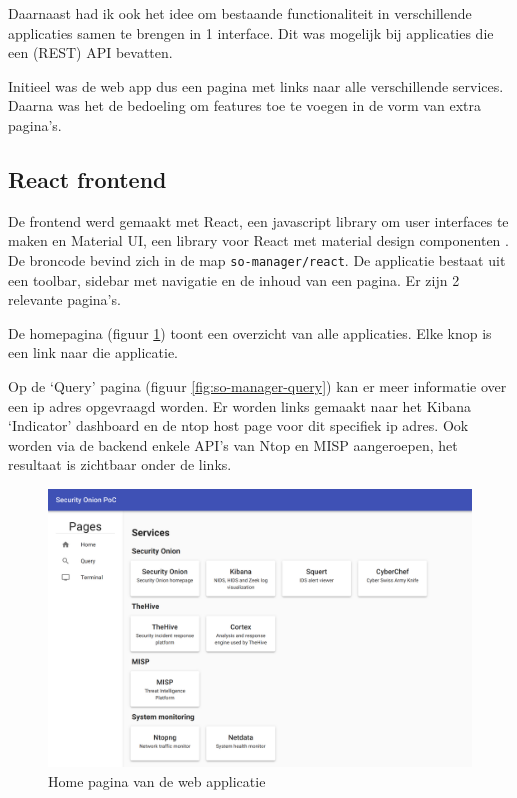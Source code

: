 \documentclass[a4paper,12pt]{report}
\begin{document}
Daarnaast had ik ook het idee om bestaande functionaliteit in verschillende applicaties samen te brengen in 1 interface.
Dit was mogelijk bij applicaties die een (REST) API bevatten.

Initieel was de web app dus een pagina met links naar alle verschillende services.
Daarna was het de bedoeling om features toe te voegen in de vorm van extra pagina's.

\subsection{React frontend}
\label{sec:so-manager-frontend}
De frontend werd gemaakt met React, een javascript library om user interfaces te maken \autocite{react:home} en Material UI, een library voor React met material design componenten \autocite{material-ui:home}.
De broncode bevind zich in de map \lstinline|so-manager/react|.
De applicatie bestaat uit een toolbar, sidebar met navigatie en de inhoud van een pagina.
Er zijn 2 relevante pagina's.

De homepagina (figuur \ref{fig:so-manager-home}) toont een overzicht van alle applicaties.
Elke knop is een link naar die applicatie.

Op de `Query' pagina (figuur \ref{fig:so-manager-query}) kan er meer informatie over een ip adres opgevraagd worden.
Er worden links gemaakt naar het Kibana `Indicator' dashboard en de ntop host page voor dit specifiek ip adres.
Ook worden via de backend enkele API's van Ntop en MISP aangeroepen, het resultaat is zichtbaar onder de links.

\begin{figure}[H]
  \centering
  \includegraphics[width=\textwidth]{so-manager-home}
  \caption{Home pagina van de web applicatie}
  \label{fig:so-manager-home}
\end{figure}
\end{document}
